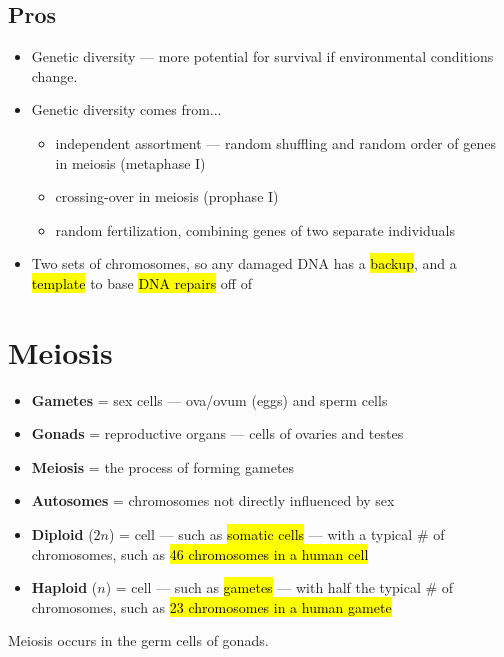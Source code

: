 \documentclass[a4paper,12pt]{article}
\begin{document}
\subsection{Pros}
\begin{itemize}
    \item{Genetic diversity --- more potential for survival if environmental conditions change.}
    \item{
            Genetic diversity comes from...
            \begin{itemize}
                \item{independent assortment --- random shuffling and random order of genes in meiosis (metaphase I)}
                \item{crossing-over in meiosis (prophase I)}
                \item{random fertilization, combining genes of two separate individuals}
            \end{itemize}
        }
    \item{Two sets of chromosomes, so any damaged DNA has a \hl{backup}, and a \hl{template} to base \hl{DNA repairs} off of}
\end{itemize}

\section{Meiosis}
\begin{itemize}
    \item{\textbf{Gametes} = sex cells --- \female\! ova/ovum (eggs) and \male\! sperm cells}
    \item{\textbf{Gonads} = reproductive organs --- cells of \female\! ovaries and \male\! testes}
    \item{\textbf{Meiosis} = the process of forming gametes}
    \item{\textbf{Autosomes} = chromosomes not directly influenced by sex}
        \\
    \item{\textbf{Diploid} ($2n$) = cell --- such as \hl{somatic cells} --- with a typical \# of chromosomes, such as \hl{46 chromosomes in a human cell}}
    \item{\textbf{Haploid} ($n$) = cell --- such as \hl{gametes} --- with half the typical \# of chromosomes, such as \hl{23 chromosomes in a human gamete}}
\end{itemize}

Meiosis occurs in the germ cells of gonads.
\end{document}
